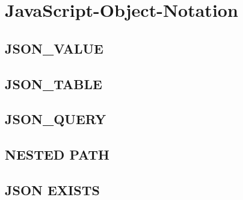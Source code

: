 \section[JSON]{JavaScript-Object-Notation}
\label{sec:json}

\subsection{JSON\_VALUE}
\label{sec:json.json_value}

\subsection{JSON\_TABLE}
\label{sec:json.jason_table}

\subsection{JSON\_QUERY}
\label{sec:json.jason_query}

\subsection{NESTED PATH}
\label{sec:json.nested_path}

\subsection{JSON EXISTS}
\label{sec:json.json_exists}
